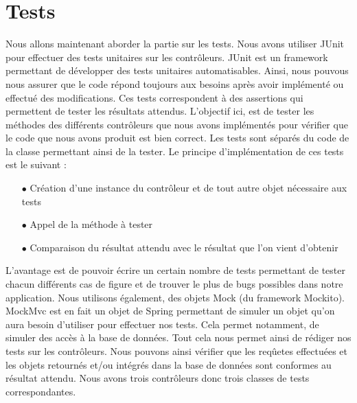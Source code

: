 \documentclass[a4paper]{report}
\begin{document}
\chapter{Tests}


Nous allons maintenant aborder la partie sur les tests. Nous avons utiliser JUnit pour effectuer des tests unitaires sur les contrôleurs. JUnit est un framework permettant de développer des tests unitaires
automatisables. Ainsi, nous pouvous nous assurer que le code répond toujours aux besoins après avoir implémenté ou effectué des modifications. Ces tests correspondent à des assertions qui permettent de tester les résultats 
attendus. L'objectif ici, est de tester les méthodes des différents contrôleurs que nous avons implémentés pour vérifier que le code que nous avons produit est bien correct.
Les tests sont séparés du code de la classe permettant ainsi de la tester. Le principe d'implémentation de ces tests est le suivant : \newline
\begin{itemize}
    \item[$\bullet$] Création d'une instance du contrôleur et de tout autre objet nécessaire aux tests
    \item[$\bullet$] Appel de la méthode à tester
    \item[$\bullet$] Comparaison du résultat attendu avec le résultat que l'on vient d'obtenir \newline
\end{itemize}
L'avantage est de pouvoir écrire un certain nombre de tests permettant de tester chacun différents cas de figure et de trouver le plus de bugs possibles dans notre application.
Nous utilisons également, des objets Mock (du framework Mockito). MockMvc est en fait un objet de Spring permettant de simuler un objet qu'on aura besoin d'utiliser pour effectuer nos tests. Cela permet notamment, de simuler
des accès à la base de données.
Tout cela nous permet ainsi de rédiger nos tests sur les contrôleurs. Nous pouvons ainsi vérifier que les reqûetes effectuées et les objets retournés et/ou intégrés dans la base de données
sont conformes au résultat attendu.
Nous avons trois contrôleurs donc trois classes de tests correspondantes.
\end{document}
